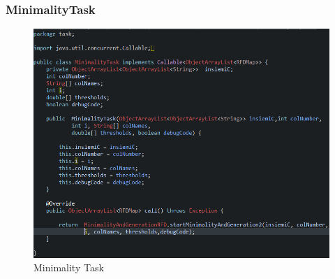 \subsubsection{MinimalityTask}
\begin{figure}[H]
	\centering
	\includegraphics[scale=0.85]{Immagini/MinimalityTask.PNG}
	\caption{Minimality Task}
	\label{fig:Minimality Task}
\end{figure}




